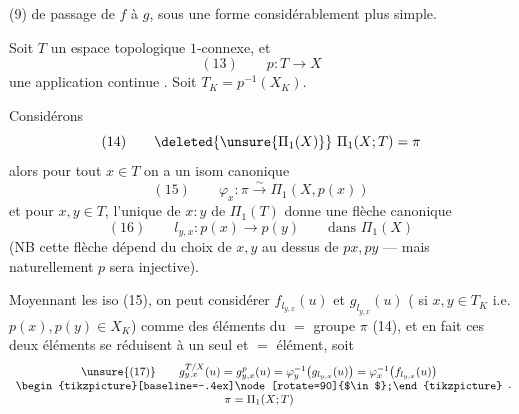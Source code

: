 (9) de passage de $f$ à $g$, sous une forme considérablement plus simple.

Soit $T$ un espace topologique  $1$-connexe, et
\[
(13)\qquad p:T\longrightarrow X
\]
une application continue . Soit $T_K=p^{-1}(X_K)$.

Considérons 
\[
(14)\qquad\deleted{\unsure{\Pi_1(X)}}\ \Pi_1(X;T)=\pi
\]
alors pour tout $x\in T$ on a un isom canonique
\[
(15)\qquad\varphi_x:\pi\xrightarrow{\sim}\Pi_1(X,p(x))
\]
et pour $x,y\in T$, l'unique   de  $x:y$ de $\Pi_1(T)$ donne  une flèche canonique
\[
(16)\qquad l_{y,x}:p(x)\longrightarrow p(y)\qquad\text{dans }\Pi_1(X)
\]
(NB cette flèche dépend du choix de $x,y$ au dessus de $px,py$ --- mais naturellement $p$ sera injective).

Moyennant les iso (15), on peut considérer $f_{l_{y,x}}(u)$ et $g_{l_{y,x}}(u)$ ( si $x,y\in T_K$ i.e. $p(x),p(y)\in X_K$) comme des éléments du $=$ groupe $\pi$ (14),  et en fait ces deux éléments se réduisent à un seul et $=$ élément, soit
\[
\begin{array}{c}
\unsure{(17)}\qquad g_{y,x}^{T/X}(u)=g_{y,x}^{p}(u)=\varphi_y^{-1}\bigl(g_{l_{y,x}}(u)\bigr)=\varphi_x^{-1}\bigl(f_{l_{y,x}}(u)\bigr)\\
\begin{tikzpicture}[baseline=-.4ex]\node[rotate=90]{$\in$};\end{tikzpicture}\\
\pi=\Pi_1(X;T)
\end{array}.
\]

